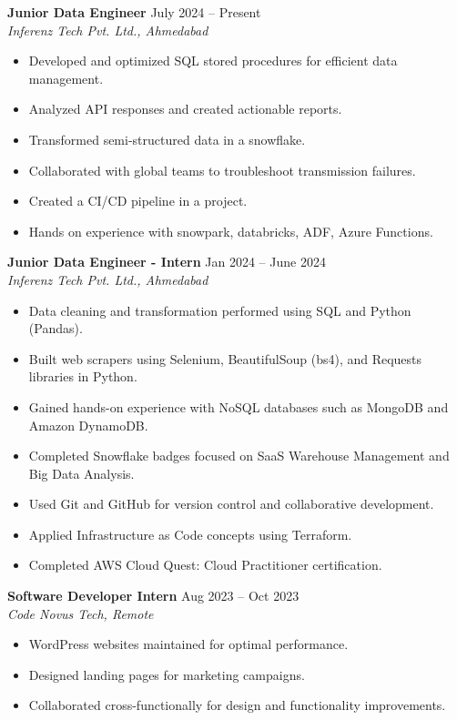 \documentclass[11pt,a4paper]{article}
\begin{document}
\textbf{Junior Data Engineer} \hfill July 2024 – Present \\
\textit{Inferenz Tech Pvt. Ltd., Ahmedabad} 
\begin{itemize}
  \item Developed and optimized SQL stored procedures for efficient data management.
  \item Analyzed API responses and created actionable reports.
  \item Transformed semi-structured data in a snowflake.
  \item Collaborated with global teams to troubleshoot transmission failures.
  \item Created a CI/CD pipeline in a project.
  \item Hands on experience with snowpark, databricks, ADF, Azure Functions.
\end{itemize}
\vspace{0.8cm}
\textbf{Junior Data Engineer - Intern} \hfill Jan 2024 – June 2024 \\
\textit{Inferenz Tech Pvt. Ltd., Ahmedabad} 
\begin{itemize}
  \item Data cleaning and transformation performed using SQL and Python (Pandas).
  \item Built web scrapers using Selenium, BeautifulSoup (bs4), and Requests libraries in Python.
  \item Gained hands-on experience with NoSQL databases such as MongoDB and Amazon DynamoDB.
  \item Completed Snowflake badges focused on SaaS Warehouse Management and Big Data Analysis.
  \item Used Git and GitHub for version control and collaborative development.
  \item Applied Infrastructure as Code concepts using Terraform.
  \item Completed AWS Cloud Quest: Cloud Practitioner certification.
\end{itemize}
\vspace{0.8cm}

\textbf{Software Developer Intern} \hfill Aug 2023 – Oct 2023 \\
\textit{Code Novus Tech, Remote}
\begin{itemize}
  \item WordPress websites maintained for optimal performance.
  \item Designed landing pages for marketing campaigns.
  \item Collaborated cross-functionally for design and functionality improvements.
\end{itemize}
\end{document}
